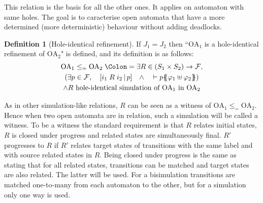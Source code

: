 \documentclass{article}
\theoremstyle{plain}
\theoremstyle{definition}
\newtheorem{defi}{Definition}
\newcommand\mpar[1]{{\left(#1\right)}}
\newcommand\mbrk[1]{{\left[#1\right]}}
\newcommand\mbrc[1]{{\left\{#1\right\}}}
\newcommand\psubst[1]{\mbrc{\!\!\mbrc{#1}\!\!}}
\newcommand\midbar{\,\middle|\,}
\newcommand\prel[4]{\mbrk{#2\mathrel{#1}#3\midbar #4}}
\newcommand\defnotation{\DOTSB\;{\Colon=}\;}
\newcommand\qwedge{\DOTSB\quad{\wedge}\quad}
\newcommand\fformulae[1]{{\mathcal{F}}}
\begin{document}
This relation is the basis for all the other ones.
It applies on automaton with same holes.
The goal is to caracterise open automata that have a more determined (more deterministic) behaviour without adding deadlocks.
\begin{defi}[Hole-identical refinement]
If \(J_1 = J_2\) then ``\(\mathrm{OA}_1\) is a hole-identical refinement of \(\mathrm{OA}_2\)" is defined, and its definition is as follows:
\begin{multline*}
	\mathrm{OA}_1 \leq_= \mathrm{OA}_2 \defnotation \exists R \in \mpar{S_1 \times S_2} \to \fformulae{E}, \\
	\mpar{\exists p \in \fformulae{E}, \quad \prel{R}{i_1}{i_2}{p} \qwedge \vdash p\psubst{\varphi_1 \uplus \varphi_2}} \\
	\wedge R \text{ hole-identical simulation of } \mathrm{OA}_1 \text{ in } \mathrm{OA}_2
\end{multline*}
\end{defi}
As in other simulation-like relations, \(R\) can be seen as a witness of \(\mathrm{OA}_1 \leq_= \mathrm{OA}_2\).
Hence when two open automata are in relation, such a simulation will be called a witness.
To be a witness the standard requirement is that \(R\) relates initial states, \(R\) is closed under progress and related states are simultaneously final.
\(R'\) progresses to \(R\) if \(R'\) relates target states of transitions with the same label and with source related states in \(R\).
Being closed under progress is the same as stating that for all related states, transitions can be matched and target states are also related.
The latter will be used.
For a bisimulation transitions are matched one-to-many from each automaton to the other, but for a simulation only one way is used.
\end{document}
